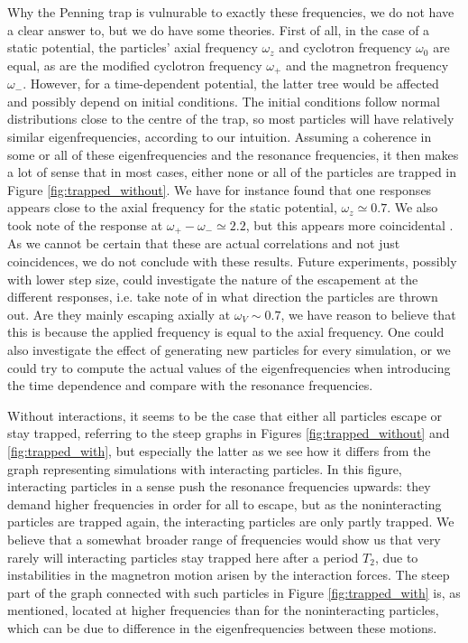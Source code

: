 Why the Penning trap is vulnurable to exactly these frequencies, we do not have a clear answer to, but we do have some theories. First of all, in the case of a static potential, the particles' axial frequency $\omega_z$ and cyclotron frequency $\omega_0$ are equal, as are the modified cyclotron frequency $\omega_+$ and the magnetron frequency $\omega_-$. However, for a time-dependent potential, the latter tree would be affected and possibly depend on initial conditions. The initial conditions follow normal distributions close to the centre of the trap, so most particles will have relatively similar eigenfrequencies, according to our intuition. Assuming a coherence in some or all of these eigenfrequencies and the resonance frequencies, it then makes a lot of sense that in most cases, either none or all of the particles are trapped in Figure \ref{fig:trapped_without}. We have for instance found that one responses appears close to the axial frequency for the static potential, $\omega_z \simeq 0.7$. We also took note of the response at $\omega_+ - \omega_- \simeq 2.2$, but this appears more coincidental . As we cannot be certain that these are actual correlations and not just coincidences, we do not conclude with these results. Future experiments, possibly with lower step size, could investigate the nature of the escapement at the different responses, i.e. take note of in what direction the particles are thrown out. Are they mainly escaping axially at $\omega_V \sim 0.7$, we have reason to believe that this is because the applied frequency is equal to the axial frequency. One could also investigate the effect of generating new particles for every simulation, or we could try to compute the actual values of the eigenfrequencies when introducing the time dependence and compare with the resonance frequencies.


Without interactions, it seems to be the case that either all particles escape or stay trapped, referring to the steep graphs in Figures \ref{fig:trapped_without} and \ref{fig:trapped_with}, but especially the latter as we see how it differs from the graph representing simulations with interacting particles. In this figure, interacting particles in a sense push the resonance frequencies upwards: they demand higher frequencies in order for all to escape, but as the noninteracting particles are trapped again, the interacting particles are only partly trapped. We believe that a somewhat broader range of frequencies would show us that very rarely will interacting particles stay trapped here after a period $T_2$, due to instabilities in the magnetron motion arisen by the interaction forces. The steep part of the graph connected with such particles in Figure \ref{fig:trapped_with} is, as mentioned, located at higher frequencies than for the noninteracting particles, which can be due to difference in the eigenfrequencies between these motions.

